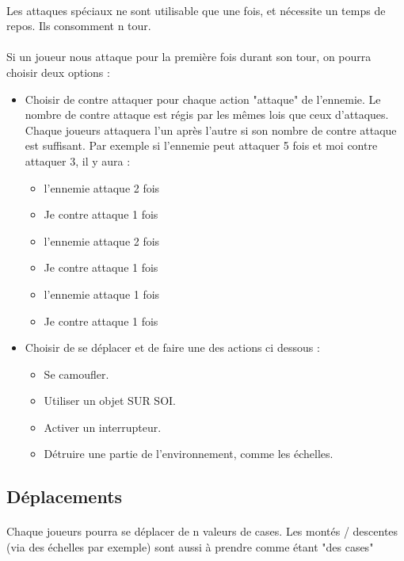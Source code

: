 \paragraph{} Les attaques spéciaux ne sont utilisable que une fois, et nécessite un temps de repos. Ils consomment n tour.

\paragraph{} Si un joueur nous attaque pour la première fois durant son tour, on pourra choisir deux options :
\begin{itemize}
	\item Choisir de contre attaquer pour chaque action "attaque" de l'ennemie. Le nombre de contre attaque est régis par les mêmes lois que ceux d'attaques. Chaque joueurs attaquera l'un après l'autre si son nombre de contre attaque est suffisant. Par exemple si l'ennemie peut attaquer 5 fois et moi contre attaquer 3, il y aura :
		\begin{itemize}
			\item l'ennemie attaque 2 fois
			\item Je contre attaque 1 fois
			\item l'ennemie attaque 2 fois
			\item Je contre attaque 1 fois
			\item l'ennemie attaque 1 fois
			\item Je contre attaque 1 fois
		\end{itemize}

	\item Choisir de se déplacer et de faire une des actions ci dessous :
		\begin{itemize}
			\item Se camoufler.
			\item Utiliser un objet SUR SOI.
			\item Activer un interrupteur.
			\item Détruire une partie de l'environnement, comme les échelles.
		\end{itemize}
\end{itemize}


\subsection{Déplacements}
\paragraph{} Chaque joueurs pourra se déplacer de n valeurs de cases. Les montés / descentes (via des échelles par exemple) sont aussi à prendre comme étant "des cases"

